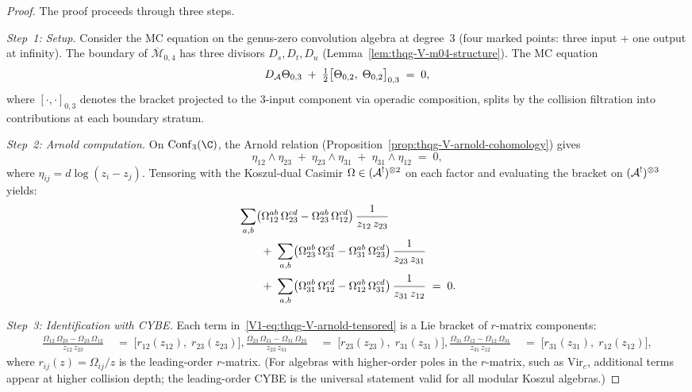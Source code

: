 \begin{proof}
The proof proceeds through three steps.

\emph{Step~1: Setup.}
Consider the MC equation on the genus-zero convolution algebra at
degree~$3$ (four marked points: three input + one output at infinity).
The boundary of $\overline{\mathcal{M}}_{0,4}$ has three divisors
$D_s, D_t, D_u$ (Lemma~\ref{lem:thqg-V-m04-structure}).
The MC equation
\begin{equation}%
D_\cA\Theta_{0,3}
\;+\;
\tfrac{1}{2}\bigl[\Theta_{0,2},\;\Theta_{0,2}\bigr]_{0,3}
\;=\; 0,
\end{equation}
where $[\cdot,\cdot]_{0,3}$ denotes the bracket projected to the
$3$-input component via operadic composition, splits by the collision
filtration into contributions at each boundary stratum.

\emph{Step~2: Arnold computation.}
On $\Conf_3(\C)$, the Arnold relation
(Proposition~\ref{prop:thqg-V-arnold-cohomology}) gives
\begin{equation}%
\eta_{12} \wedge \eta_{23}
\;+\;
\eta_{23} \wedge \eta_{31}
\;+\;
\eta_{31} \wedge \eta_{12}
\;=\; 0,
\end{equation}
where $\eta_{ij} = d\log(z_i - z_j)$.
Tensoring with the Koszul-dual Casimir
$\Omega \in (\mathcal{A}^!)^{\otimes 2}$ on each factor and evaluating
the bracket on $(\mathcal{A}^!)^{\otimes 3}$ yields:
\begin{align}
&\sum_{a,b} \bigl(\Omega_{12}^{ab}\,\Omega_{23}^{cd}
 - \Omega_{23}^{ab}\,\Omega_{12}^{cd}\bigr)\,
 \frac{1}{z_{12}\,z_{23}}
\notag \\
&\qquad +\;
\sum_{a,b} \bigl(\Omega_{23}^{ab}\,\Omega_{31}^{cd}
 - \Omega_{31}^{ab}\,\Omega_{23}^{cd}\bigr)\,
 \frac{1}{z_{23}\,z_{31}}
\notag \\
&\qquad +\;
\sum_{a,b} \bigl(\Omega_{31}^{ab}\,\Omega_{12}^{cd}
 - \Omega_{12}^{ab}\,\Omega_{31}^{cd}\bigr)\,
 \frac{1}{z_{31}\,z_{12}}
\;=\; 0.
\end{align}

\emph{Step~3: Identification with CYBE.}
Each term in~\eqref{V1-eq:thqg-V-arnold-tensored} is a Lie bracket of
$r$-matrix components:
\begin{align}
\frac{\Omega_{12}\,\Omega_{23}
 - \Omega_{23}\,\Omega_{12}}{z_{12}\,z_{23}}
&\;=\;
\bigl[r_{12}(z_{12}),\;r_{23}(z_{23})\bigr],
\frac{\Omega_{23}\,\Omega_{31}
 - \Omega_{31}\,\Omega_{23}}{z_{23}\,z_{31}}
&\;=\;
\bigl[r_{23}(z_{23}),\;r_{31}(z_{31})\bigr],
\frac{\Omega_{31}\,\Omega_{12}
 - \Omega_{12}\,\Omega_{31}}{z_{31}\,z_{12}}
&\;=\;
\bigl[r_{31}(z_{31}),\;r_{12}(z_{12})\bigr],
\end{align}
where $r_{ij}(z) = \Omega_{ij}/z$ is the leading-order $r$-matrix.
(For algebras with higher-order poles in the $r$-matrix, such as
$\mathrm{Vir}_c$, additional terms appear at higher collision depth;
the leading-order CYBE is the universal statement valid for all
modular Koszul algebras.)


\end{proof}
